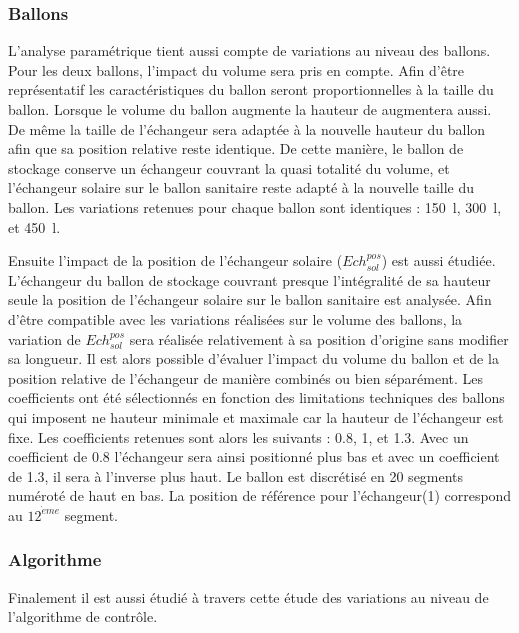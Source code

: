 \subsubsection{Ballons} %
\label{ssub:ballons}
L’analyse paramétrique tient aussi compte de variations au niveau des ballons.
Pour les deux ballons, l’impact du volume sera pris en compte. Afin d’être
représentatif les caractéristiques du ballon seront proportionnelles à la taille
du ballon. Lorsque le volume du ballon augmente la hauteur de augmentera aussi.
De même la taille de l’échangeur sera adaptée à la nouvelle hauteur du ballon
afin que sa position relative reste identique. De cette manière, le ballon de
stockage conserve un échangeur couvrant la quasi totalité du volume, et
l’échangeur solaire sur le ballon sanitaire reste adapté à la nouvelle taille du
ballon. Les variations retenues pour chaque ballon sont identiques :
\SI{150}{l}, \SI{300}{l}, et \SI{450}{l}.

Ensuite l’impact de la position de l’échangeur solaire ($Ech_{sol}^{pos}$) est aussi étudiée. L’échangeur du
ballon de stockage couvrant presque l’intégralité de sa hauteur seule la position de
l’échangeur solaire sur le ballon sanitaire est analysée. Afin d’être compatible avec les
variations réalisées sur le volume des ballons, la variation de $Ech_{sol}^{pos}$
sera réalisée relativement à sa position d’origine sans modifier sa longueur. Il est alors
possible d’évaluer l’impact du volume du ballon et de la position relative de l’échangeur
de manière combinés ou bien séparément. Les coefficients ont été sélectionnés en fonction
des limitations techniques des ballons qui imposent ne hauteur minimale et maximale car la
hauteur de l’échangeur est fixe. Les coefficients retenues sont alors les suivants :
\num{0.8}, \num{1}, et \num{1.3}. Avec un coefficient de \num{0.8} l’échangeur sera ainsi
positionné plus bas et avec un coefficient de \num{1.3}, il sera à l’inverse plus haut.
Le ballon est discrétisé en \num{20} segments numéroté de haut en bas. La position de
référence pour l’échangeur(\num{1}) correspond au $12^{\grave eme}$ segment.


\subsubsection{Algorithme} %
\label{ssub:variations_algorithmiques}
Finalement il est aussi étudié à travers cette étude des variations au niveau
de l’algorithme de contrôle.

